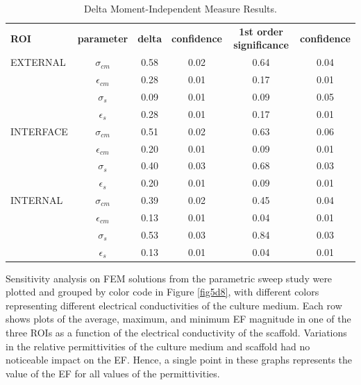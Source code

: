 \begin{table}
\caption{ Delta Moment-Independent Measure Results.}
\bigskip
\small
\centering
\begin{tabularx}{405px}{l c c c c c} \toprule[0.15em]
\textbf{ROI} & \textbf{parameter} & \textbf{delta} & \textbf{confidence} & \textbf{1st order significance} & \textbf{ confidence} \\ \cmidrule(l){1-6}
EXTERNAL & $\sigma_{cm}$ &  0.58 & 0.02 & 0.64 & 0.04 \\
& $\epsilon_{cm}$ & 0.28 & 0.01 & 0.17 & 0.01\\
& $\sigma_{s}$  & 0.09 & 0.01 & 0.09 & 0.05\\
& $\epsilon_{s}$ & 0.28 & 0.01 & 0.17 & 0.01 \\ \cmidrule(l){1-6}
INTERFACE & $\sigma_{cm}$ &  0.51 & 0.02 & 0.63 & 0.06 \\
& $\epsilon_{cm}$ & 0.20 & 0.01 & 0.09 & 0.01\\
& $\sigma_{s}$  & 0.40 & 0.03 & 0.68 & 0.03\\
& $\epsilon_{s}$ & 0.20 & 0.01 & 0.09 & 0.01 \\ \cmidrule(l){1-6}
INTERNAL & $\sigma_{cm}$ &  0.39 & 0.02 & 0.45 & 0.04 \\
& $\epsilon_{cm}$ & 0.13 & 0.01 & 0.04 & 0.01\\
& $\sigma_{s}$  & 0.53 & 0.03 & 0.84 & 0.03\\
& $\epsilon_{s}$ & 0.13 & 0.01 & 0.04 & 0.01 \\ \bottomrule[0.15em]
\end{tabularx}
\label{table_delta}
\end{table}


Sensitivity analysis on \acs{FEM} solutions from the parametric sweep study were plotted and grouped by color code in Figure \ref{fig5d8}, with different colors representing different electrical conductivities of the culture medium. Each row shows plots of the average, maximum, and minimum \acs{EF} magnitude in one of the three \acs{ROI}s as a function of the electrical conductivity of the scaffold. Variations in the relative permittivities of the culture medium and scaffold had no noticeable impact on the \acs{EF}. Hence, a single point in these graphs represents the value of the \acs{EF} for all values of the permittivities.


